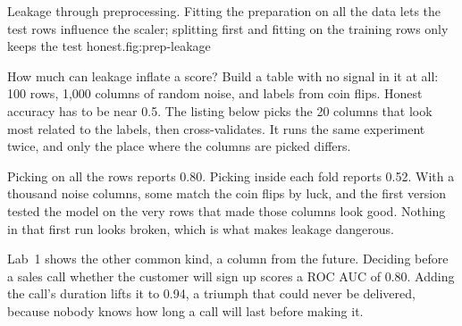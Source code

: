 \begin{utpfig}{Leakage through preprocessing. Fitting the preparation on all the data lets the test rows influence the scaler; splitting first and fitting on the training rows only keeps the test honest.}{fig:prep-leakage}
\end{utpfig}

\begin{workedexample}
How much can leakage inflate a score? Build a table with no signal in it at all: 100 rows, 1,000 columns of random noise, and labels from coin flips. Honest accuracy has to be near 0.5. The listing below picks the 20 columns that look most related to the labels, then cross-validates. It runs the same experiment twice, and only the place where the columns are picked differs.



Picking on all the rows reports 0.80. Picking inside each fold reports 0.52. With a thousand noise columns, some match the coin flips by luck, and the first version tested the model on the very rows that made those columns look good. Nothing in that first run looks broken, which is what makes leakage dangerous.

Lab~1 shows the other common kind, a column from the future. Deciding before a sales call whether the customer will sign up scores a ROC AUC of 0.80. Adding the call's duration lifts it to 0.94, a triumph that could never be delivered, because nobody knows how long a call will last before making it.
\end{workedexample}

